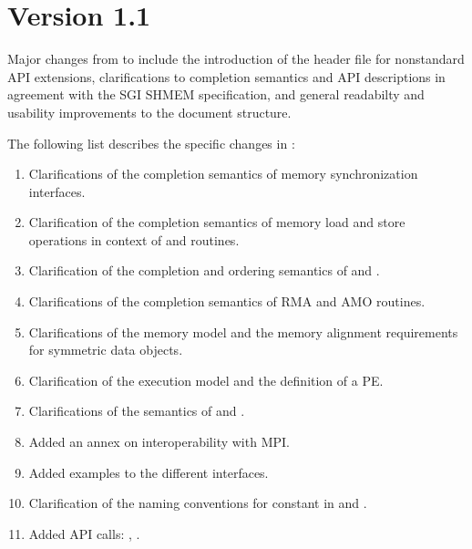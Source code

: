 \section{Version 1.1}
Major changes from \openshmem[1.0] to \openshmem[1.1] include
the introduction of the  header file for nonstandard \ac{API}
extensions,
clarifications to completion semantics and \ac{API} descriptions in agreement with
the \ac{SGI} SHMEM specification,
and general readabilty and usability improvements to the document structure.

The following list describes the specific changes in \openshmem[1.1]:
\begin{enumerate}
%
\item Clarifications of the completion semantics of memory synchronization
      interfaces.
%
%
\item Clarification of the completion semantics of memory load and store
      operations in context of  and 
      routines.
%
%
\item Clarification of the completion and ordering semantics of
       and .
%
%
\item Clarifications of the completion semantics of \ac{RMA} and \ac{AMO}
      routines.
%
%
\item Clarifications of the memory model and the memory alignment requirements
      for symmetric data objects.
%
%
\item Clarification of the execution model and the definition of a \ac{PE}.
%
%
\item Clarifications of the semantics of  and
      .
%
%
\item Added an annex on interoperability with \ac{MPI}.
%
%
\item Added examples to the different interfaces.
%
\item Clarification of the naming conventions for constant in \Cstd and
      \Fortran.
%
%
\item Added \ac{API} calls: , .

\end{enumerate}
